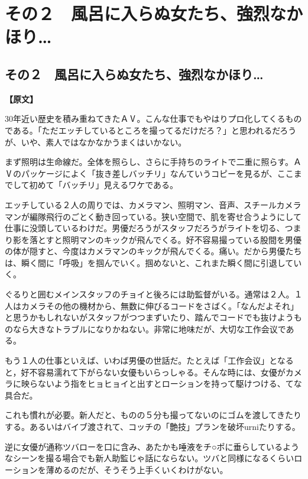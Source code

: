 \documentclass[12pt,UTF8]{ctexbook}
\begin{document}
\chapter{その２　風呂に入らぬ女たち、強烈なかほり…}
\label{chap:02}
\section{その２　風呂に入らぬ女たち、強烈なかほり…}

\vspace{1ex}
\parbox{0.9\linewidth}{
\textbf{【原文】}\par

30年近い歴史を積み重ねてきたＡⅤ。こんな仕事でもやはりプロ化してくるものである。「ただエッチしているところを撮ってるだけだろ？」と思われるだろうが、いや、素人ではなかなかうまくはいかない。

まず照明は生命線だ。全体を照らし、さらに手持ちのライトで二重に照らす。ＡⅤのパッケージによく「抜き差しバッチリ」なんていうコピーを見るが、ここまでして初めて「バッチリ」見えるワケである。

エッチしている２人の周りでは、カメラマン、照明マン、音声、スチールカメラマンが編隊飛行のごとく動き回っている。狭い空間で、肌を寄せ合うようにして仕事に没頭しているわけだ。男優だろうがスタッフだろうがライトを切る、つまり影を落とすと照明マンのキックが飛んでくる。好不容易撮っている股間を男優の体が隠すと、今度はカメラマンのキックが飛んでくる。痛い。だから男優たちは、瞬く間に「呼吸」を掴んでいく。掴めないと、これまた瞬く間に引退していく。

ぐるりと囲むメインスタッフのチョイと後ろには助監督がいる。通常は２人。１人はカメラその他の機材から、無数に伸びるコードをさばく。「なんだよそれ」と思うかもしれないがスタッフがつつまずいたり、踏んでコードでも抜けようものなら大きなトラブルになりかねない。非常に地味だが、大切な工作会议である。

もう１人の仕事といえば、いわば男優の世話だ。たとえば「工作会议」となると，好不容易濡れて下がらない女優もいらっしゃる。そんな時には、女優がカメラに映らないよう指をヒョヒョイと出すとローションを持って駆けつける、てな具合だ。

これも慣れが必要。新人だと、ものの５分も撮ってないのにゴムを渡してきたりする。あるいはバイブ渡されて、コッチの「艶技」プランを破坏urniたりする。

逆に女優が通称ツバローを口に含み、あたかも唾液をチ○ポに垂らしているようなシーンを撮る場合でも新人助監じゃ話にならない。ツバと同様になるくらいローションを薄めるのだが、そうそう上手くいくわけがない。

}
\end{document}
